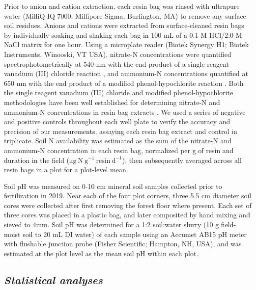     Prior to anion and cation extraction, each resin bag was rinsed with ultrapure water (MilliQ IQ 7000; Millipore Sigma, Burlington, MA) to remove any surface soil residues. Anions and cations were extracted from surface-cleaned resin bags by individually soaking and shaking each bag in 100 mL of a 0.1 M HCl/2.0 M NaCl matrix for one hour. Using a microplate reader (Biotek Synergy H1; Biotek Instruments, Winooski, VT USA), nitrate-N concentrations were quantified spectrophotometrically at 540 nm with the end product of a single reagent vanadium (III) chloride reaction , and ammonium-N concentrations quantified at 650 nm with the end product of a modified phenol-hypochlorite reaction . Both the single reagent vanadium (III) chloride and modified phenol-hypochlorite methodologies have been well established for determining nitrate-N and ammonium-N concentrations in resin bag extracts . We used a series of negative and positive controls throughout each well plate to verify the accuracy and precision of our measurements, assaying each resin bag extract and control in triplicate. Soil N availability was estimated as the sum of the nitrate-N and ammonium-N concentration in each resin bag, normalized per g of resin and duration in the field ($\mathrm{\mu g\ N\ g^{-1}\ resin\ d^{-1}}$), then subsequently averaged across all resin bags in a plot for a plot-level mean.
    
    Soil pH was measured on 0-10 cm mineral soil samples collected prior to fertilization in 2019. Near each of the four plot corners, three 5.5 cm diameter soil cores were collected after first removing the forest floor where present. Each set of three cores was placed in a plastic bag, and later composited by hand mixing and sieved to 4mm. Soil pH was determined for a 1:2 soil:water slurry (10 g field-moist soil to 20 mL DI water) of each sample using an Accumet AB15 pH meter with flushable junction probe (Fisher Scientific; Hampton, NH, USA), and was estimated at the plot level as the mean soil pH within each plot.

    \subsection{\textit{Statistical analyses}}

